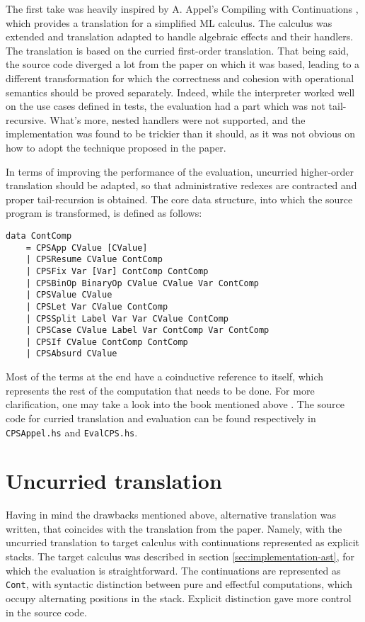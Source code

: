 \documentclass[declaration,shortabstract]{iithesis}
\begin{document}
    The first take was heavily inspired by A. Appel's Compiling with Continuations
    \cite{appel-continuations}, which provides a translation for a simplified ML
    calculus. The calculus was extended and translation adapted to handle algebraic
    effects and their handlers. The translation is based on the curried first-order
    translation. That being said, the source code diverged a lot from the paper on
    which it was based, leading to a different transformation for which
    the correctness and cohesion with operational semantics should be proved
    separately. Indeed, while the interpreter worked well on the use cases
    defined in tests, the evaluation had a part which was not tail-recursive. What's
    more, nested handlers were not supported, and the implementation was found to be
    trickier than it should, as it was not obvious on how to adopt the technique
    proposed in the paper.

    In terms of improving the performance of the evaluation, uncurried higher-order
    translation should be adapted, so that administrative redexes are contracted
    and proper tail-recursion is obtained. The core data structure, into which the
    source program is transformed, is defined as follows:

    \begin{verbatim}
data ContComp
    = CPSApp CValue [CValue]
    | CPSResume CValue ContComp
    | CPSFix Var [Var] ContComp ContComp
    | CPSBinOp BinaryOp CValue CValue Var ContComp
    | CPSValue CValue
    | CPSLet Var CValue ContComp
    | CPSSplit Label Var Var CValue ContComp
    | CPSCase CValue Label Var ContComp Var ContComp
    | CPSIf CValue ContComp ContComp
    | CPSAbsurd CValue
    \end{verbatim}
    Most of the terms at the end have a coinductive reference to itself, which represents
    the rest of the computation that needs to be done. For more clarification,
    one may take a look into the book mentioned above \cite{appel-continuations}. The source code for curried
    translation and evaluation can be found respectively in \verb!CPSAppel.hs! and
    \verb!EvalCPS.hs!.

    \section{Uncurried translation}

    Having in mind the drawbacks mentioned above, alternative translation was
    written, that coincides with the translation from the paper. Namely, with
    the uncurried translation to target calculus with continuations represented
    as explicit stacks. The target calculus was described in section \ref{sec:implementation-ast},
    for which the evaluation is straightforward. The continuations are represented
    as \verb!Cont!, with syntactic distinction between pure and effectful computations,
    which occupy alternating positions in the stack. Explicit distinction gave
    more control in the source code.
\end{document}
